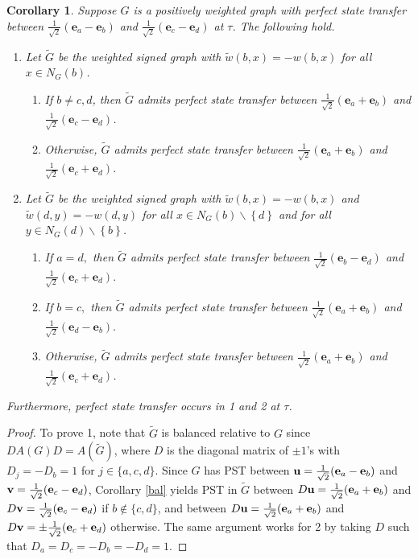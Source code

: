 \documentclass[12pt,a4paper]{article}
\newtheorem{cor}{Corollary}
\def \e {{\bf e}}
\def \u {{\bf u}}
\def \v {{\bf v}}
\def \e {{\mathbf e}}
\newcommand{\ob}[1]{\left(#1\right)}
\newcommand{\cb}[1]{\left\lbrace #1\right\rbrace}
\begin{document}
\begin{cor}
\label{cor}
Suppose $G$ is a positively weighted graph with perfect state transfer between $\frac{1}{\sqrt2}(\e_a-\e_b)$ and $\frac{1}{\sqrt2}(\e_c-\e_d)$ at $\tau$. The following hold.
\begin{enumerate}[leftmargin=*]
\item Let $\tilde{G}$ be the weighted signed graph with $\tilde{w}\ob{b,x}=-w(b,x)$ for all $x\in N_G(b)$.
\begin{enumerate}[leftmargin=*]
\item If $b\neq c,d$, then $\tilde{G}$ admits perfect state transfer between $\frac{1}{\sqrt2}(\e_a+\e_b)$ and $\frac{1}{\sqrt2}(\e_c-\e_d)$. 
\item Otherwise, $\tilde{G}$ admits perfect state transfer between $\frac{1}{\sqrt2}(\e_a+\e_b)$ and $\frac{1}{\sqrt2}(\e_c+\e_d).$  
\end{enumerate}
\item Let $\tilde{G}$ be the weighted signed graph with $\tilde{w}\ob{b,x}=-w\ob{b,x}$ and $\tilde{w}\ob{d,y}=-w(d,y)$ for all $x\in N_G(b)\backslash \cb{d}$ and for all $y\in N_G(d)\backslash \cb{b}$.
\begin{enumerate}
\item If $a=d,$ then $\tilde{G}$ admits perfect state transfer between $\frac{1}{\sqrt2}(\e_b-\e_d)$ and $\frac{1}{\sqrt2}(\e_c+\e_d).$
\item If $b=c,$ then $\tilde{G}$ admits perfect state transfer between $\frac{1}{\sqrt2}(\e_a+\e_b)$ and $\frac{1}{\sqrt2}(\e_d-\e_b).$
\item Otherwise, $\tilde{G}$ admits perfect state transfer between $\frac{1}{\sqrt2}(\e_a+\e_b)$ and $\frac{1}{\sqrt2}(\e_c+\e_d)$. 
\end{enumerate}
   \end{enumerate}
Furthermore, perfect state transfer occurs in 1 and 2 at $\tau$.
 \end{cor}

\begin{proof}
To prove 1, note that $\tilde{G}$ is balanced relative to $G$ since $DA(G)D=A(\tilde{G})$, where $D$ is the diagonal matrix of $\pm 1$'s with $D_j=-D_b=1$ for $j\in\{a,c,d\}$. %
Since $G$ has PST between $\u=\frac{1}{\sqrt2}(\e_a-\e_b)$ and $\v=\frac{1}{\sqrt2}(\e_c-\e_d)$, Corollary \ref{bal} yields PST in $\tilde{G}$ between $D\u=\frac{1}{\sqrt2}(\e_a+\e_b)$ and $D\v=\frac{1}{\sqrt2}(\e_c-\e_d)$ if $b\notin\{c,d\}$, and between $D\u=\frac{1}{\sqrt2}(\e_a+\e_b)$ and $D\v=\pm\frac{1}{\sqrt2}(\e_c+\e_d)$ otherwise. The same argument works for 2 by taking $D$ such that $D_a=D_{c}=-D_b=-D_{d}=1$.
\end{proof}
\end{document}
